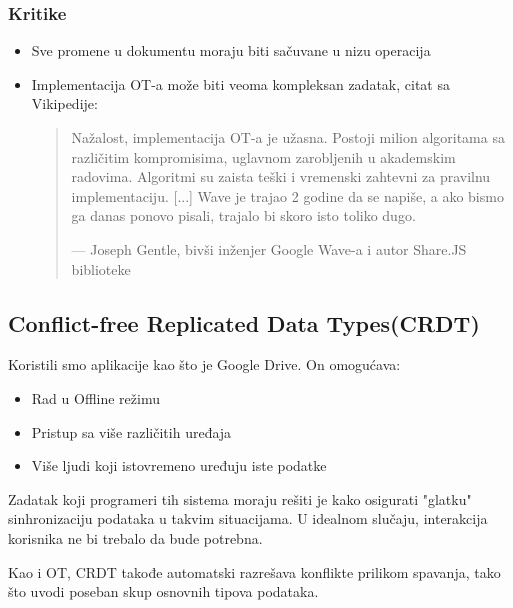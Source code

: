 \documentclass[12pt]{article}
\begin{document}
    \subsubsection{Kritike}

    \begin{itemize}
        \item Sve promene u dokumentu moraju biti sačuvane u nizu operacija
        \item Implementacija OT-a može biti veoma kompleksan zadatak, citat sa Vikipedije:

        \begin{quote}
            Nažalost, implementacija OT-a je užasna. Postoji milion algoritama sa različitim kompromisima, uglavnom zarobljenih u akademskim radovima. Algoritmi su zaista teški i vremenski zahtevni za pravilnu implementaciju. [...] Wave je trajao 2 godine da se napiše, a ako bismo ga danas ponovo pisali, trajalo bi skoro isto toliko dugo. 
            \begin{flushright}
            --- Joseph Gentle, bivši inženjer Google Wave-a i autor Share.JS biblioteke
            \end{flushright}
        \end{quote}
        
    \end{itemize}

    \subsection{Conflict-free Replicated Data Types(CRDT)}

    Koristili smo aplikacije kao što je Google Drive. On omogućava:

    \begin{itemize}
        \item Rad u Offline režimu
        \item Pristup sa više različitih uređaja
        \item Više ljudi koji istovremeno uređuju iste podatke
    \end{itemize}

    Zadatak koji programeri tih sistema moraju rešiti je kako osigurati "glatku" sinhronizaciju podataka u takvim situacijama. U idealnom slučaju, interakcija korisnika ne bi trebalo da bude potrebna.

    Kao i OT, CRDT takođe automatski razrešava konflikte prilikom spavanja, tako što uvodi poseban skup osnovnih tipova podataka.
\end{document}

